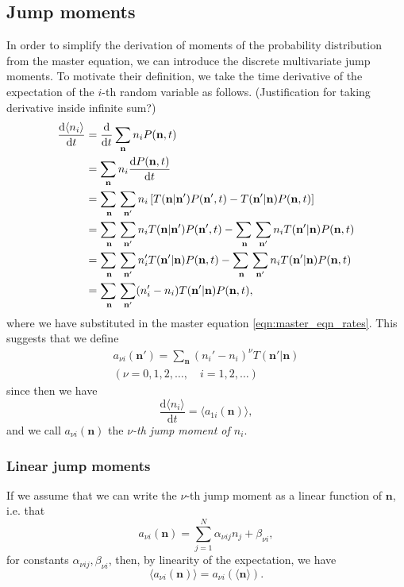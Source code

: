 \documentclass[a4paper,11pt]{article}
\numberwithin{equation}{section}
\newcommand{\diff}[2]{\frac{\mathrm{d} #1}{\mathrm{d} #2}}
\newcommand{\V}[1]{\mathbf{#1}}
\newcommand{\E}[1]{\langle #1 \rangle}
\begin{document}
\subsection{Jump moments}
In order to simplify the derivation of moments of the probability distribution
from the master equation, we can introduce the discrete multivariate jump
moments. To motivate their definition, we take the time derivative of the
expectation of the \(i\)-th random variable as follows. (Justification for
taking derivative inside infinite sum?)
\begin{align*}
    \diff{\E{n_i}}{t} &= \diff{}{t}\sum_{\V{n}}n_i P(\V{n},t)\\
    &= \sum_{\V{n}}n_i \diff{P(\V{n},t)}{t}\\
    &= \adjustlimits\sum_{\V{n}}\sum_{\V{n}'} n_i \left[ T(\V{n}|\V{n}') P(\V{n}',t) -
    T(\V{n}'|\V{n}) P(\V{n},t)\right]\\
    &= \adjustlimits\sum_{\V{n}}\sum_{\V{n}'} n_i T(\V{n}|\V{n}') P(\V{n}',t) -
    \adjustlimits\sum_{\V{n}}\sum_{\V{n}'} n_i T(\V{n}'|\V{n}) P(\V{n},t)\\
    &= \adjustlimits\sum_{\V{n}}\sum_{\V{n}'} n_i' T(\V{n}'|\V{n}) P(\V{n},t) -
    \adjustlimits\sum_{\V{n}}\sum_{\V{n}'} n_i T(\V{n}'|\V{n}) P(\V{n},t)\\
    &= \adjustlimits\sum_{\V{n}}\sum_{\V{n}'} (n_i' - n_i) T(\V{n}'|\V{n})
    P(\V{n},t),
\end{align*}
where we have substituted in the master equation \eqref{eqn:master_eqn_rates}.
This suggests that we define
\begin{equation}
    \begin{gathered}
        a_{\nu i}(\V{n}') = \sum_{\V{n}} (n_i'-n_i)^\nu T(\V{n}'|\V{n})\\
        (\nu = 0,1,2,\dotsc,\quad i=1,2,\dotsc)
    \end{gathered}
    \label{eqn:jump_moment}
\end{equation}
since then we have
\begin{equation}
    \diff{\E{n_i}}{t} = \E{a_{1i}(\V{n})},
    \label{eqn:time_evo_expectation_jump_moment}
\end{equation}
and we call \(a_{\nu i}(\V{n})\) the \emph{\(\nu\)-th jump moment of \(n_i\)}.

\subsubsection{Linear jump moments}
If we assume that we can write the \(\nu\)-th jump moment as a linear function of
\(\V{n}\), i.e. that
\begin{equation}
    a_{\nu i}(\V{n}) = \sum_{j=1}^{N} \alpha_{\nu i j} n_j + \beta_{\nu i},
    \label{eqn:linear_jump_moments_coeffs}
\end{equation}
for constants \(\alpha_{\nu i j}, \beta_{\nu i}\),
then, by linearity of the expectation, we have
\begin{equation}
    \E{a_{\nu i}(\V{n})} = a_{\nu i}(\E{\V{n}}).
    \label{eqn:linear_jump_moments}
\end{equation}
\end{document}
